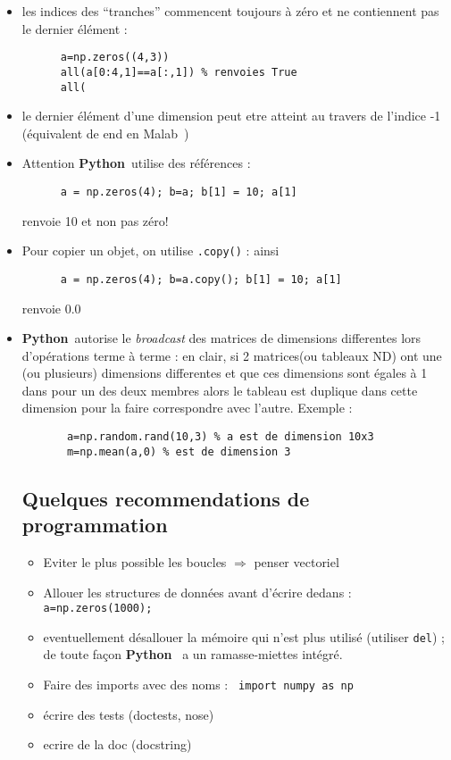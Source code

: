 \documentclass[11pt,a4wide]{article}
\newcommand{\matlab}{{\ECFTeenSpirit Malab}\ }
\newcommand{\python}{{\bf Python}\ }
\begin{document}
    \begin{itemize}
      
      \item les indices des ``tranches'' commencent toujours à zéro et ne contiennent pas le dernier élément : 
      \begin{lstlisting} 
      a=np.zeros((4,3))
      all(a[0:4,1]==a[:,1]) % renvoies True
      all(
      \end{lstlisting}
      \item le dernier élément d'une dimension peut etre atteint au travers de l'indice -1 (équivalent de end en \matlab)
      \item Attention \python utilise des références : 
      \begin{lstlisting} 
      a = np.zeros(4); b=a; b[1] = 10; a[1]
      \end{lstlisting}
      renvoie 10 et non pas zéro!
      \item Pour copier un objet, on utilise {\tt .copy()} : ainsi 
      \begin{lstlisting} 
      a = np.zeros(4); b=a.copy(); b[1] = 10; a[1]
      \end{lstlisting}
      renvoie 0.0 
      
      \item \python autorise le {\em broadcast} des matrices de dimensions differentes lors d'opérations terme à terme : en clair,
      si 2 matrices(ou tableaux ND) ont une (ou plusieurs) dimensions differentes et que ces dimensions sont égales à 1 dans
      pour un des deux membres alors le tableau est duplique dans cette dimension pour la faire correspondre avec l'autre. 
      Exemple : 
      \begin{lstlisting} 
       a=np.random.rand(10,3) % a est de dimension 10x3
       m=np.mean(a,0) % est de dimension 3

      \end{lstlisting}

  \subsection{Quelques recommendations de programmation}
 
    \begin{itemize}

      \item Eviter le plus possible les boucles $\Rightarrow$ penser vectoriel
      \item Allouer les structures de données avant d'écrire dedans : \lstinline!a=np.zeros(1000);!
      \item eventuellement désallouer la mémoire qui n'est plus utilisé (utiliser {\tt del}) ; de toute façon \python 
      a un ramasse-miettes intégré.
      \item Faire des imports avec des noms : \lstinline! import numpy as np!
      \item écrire des tests (doctests, nose)
      \item ecrire de la doc (docstring)


\end{itemize}
\end{itemize}
\end{document}
